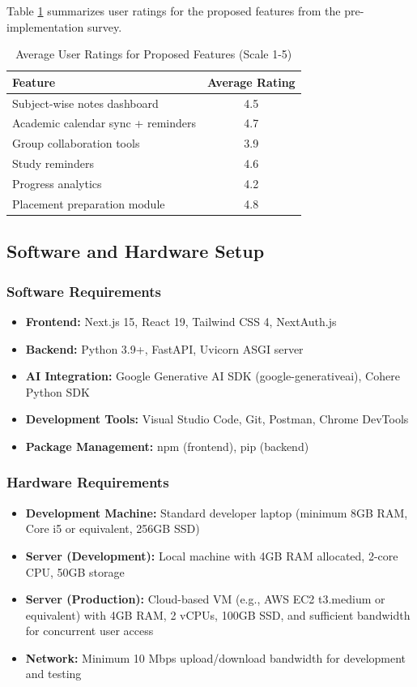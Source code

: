 \documentclass[12pt]{article}
\begin{document}
Table \ref{tab:feature_ratings} summarizes user ratings for the proposed features from the pre-implementation survey.

\begin{table}[htbp]
\caption{Average User Ratings for Proposed Features (Scale 1-5)}
\label{tab:feature_ratings}
\begin{center}
\begin{tabular}{|l|c|}
\hline
\textbf{Feature} & \textbf{Average Rating} \\
\hline
Subject-wise notes dashboard & 4.5 \\
\hline
Academic calendar sync + reminders & 4.7 \\
\hline
Group collaboration tools & 3.9 \\
\hline
Study reminders & 4.6 \\
\hline
Progress analytics & 4.2 \\
\hline
Placement preparation module & 4.8 \\
\hline
\end{tabular}
\end{center}
\end{table}

\subsection{Software and Hardware Setup}
\subsubsection{Software Requirements}
\begin{itemize}
    \item \textbf{Frontend:} Next.js 15, React 19, Tailwind CSS 4, NextAuth.js
    \item \textbf{Backend:} Python 3.9+, FastAPI, Uvicorn ASGI server
    \item \textbf{AI Integration:} Google Generative AI SDK (google-generativeai), Cohere Python SDK
    \item \textbf{Development Tools:} Visual Studio Code, Git, Postman, Chrome DevTools
    \item \textbf{Package Management:} npm (frontend), pip (backend)
\end{itemize}

\subsubsection{Hardware Requirements}
\begin{itemize}
    \item \textbf{Development Machine:} Standard developer laptop (minimum 8GB RAM, Core i5 or equivalent, 256GB SSD)
    \item \textbf{Server (Development):} Local machine with 4GB RAM allocated, 2-core CPU, 50GB storage
    \item \textbf{Server (Production):} Cloud-based VM (e.g., AWS EC2 t3.medium or equivalent) with 4GB RAM, 2 vCPUs, 100GB SSD, and sufficient bandwidth for concurrent user access
    \item \textbf{Network:} Minimum 10 Mbps upload/download bandwidth for development and testing
\end{itemize}
\end{document}
